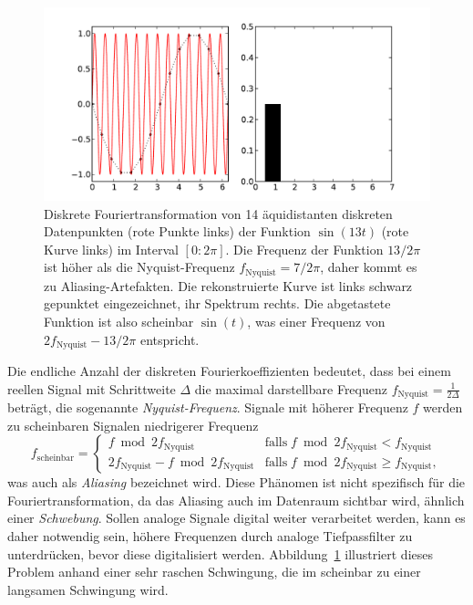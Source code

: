 \begin{figure}
  \centering
  \includegraphics[width=\textwidth]{plots/fftalias}
  \caption{Diskrete Fouriertransformation von 14 äquidistanten
    diskreten Datenpunkten (rote Punkte links) der Funktion
    $\sin(13t)$ (rote Kurve links) im Interval $[0:2\pi]$.  Die
    Frequenz der Funktion $13/2\pi$ ist höher als die Nyquist-Frequenz
    $f_\text{Nyquist}=7/2\pi$, daher kommt es zu
    Aliasing-Artefakten. Die rekonstruierte Kurve ist links schwarz
    gepunktet eingezeichnet, ihr Spektrum rechts. Die abgetastete
    Funktion ist also scheinbar $\sin(t)$, was einer Frequenz von
    $2f_\text{Nyquist} - 13/2\pi$ entspricht.}
  \label{fig:fourieralias}
\end{figure}

Die endliche Anzahl der diskreten Fourierkoeffizienten bedeutet, dass
bei einem reellen Signal mit Schrittweite $\Delta$ die maximal
darstellbare Frequenz $f_\text{Nyquist}=\frac{1}{2\Delta}$ beträgt,
die sogenannte
\emph{Nyquist-Frequenz}. Signale mit höherer
Frequenz $f$ werden zu scheinbaren Signalen niedrigerer Frequenz
\begin{equation}
  f_\text{scheinbar} = \begin{cases}
    f \bmod 2 f_\text{Nyquist} & \text{falls}\; f \bmod 2 f_\text{Nyquist}
    < f_\text{Nyquist} \\
    2f_\text{Nyquist} - f \bmod 2 f_\text{Nyquist} & \text{falls}\; f \bmod 2 f_\text{Nyquist}
    \ge f_\text{Nyquist},
  \end{cases}
\end{equation}
was auch als \emph{Aliasing} bezeichnet wird.  Diese Phänomen ist
nicht spezifisch für die Fouriertransformation, da das Aliasing auch
im Datenraum sichtbar wird, ähnlich einer \emph{Schwebung}. Sollen
analoge Signale digital weiter verarbeitet werden, kann es daher
notwendig sein, höhere Frequenzen durch analoge Tiefpassfilter zu
unterdrücken, bevor diese digitalisiert
werden. Abbildung~\ref{fig:fourieralias} illustriert dieses Problem
anhand einer sehr raschen Schwingung, die im scheinbar zu einer
langsamen Schwingung wird.

